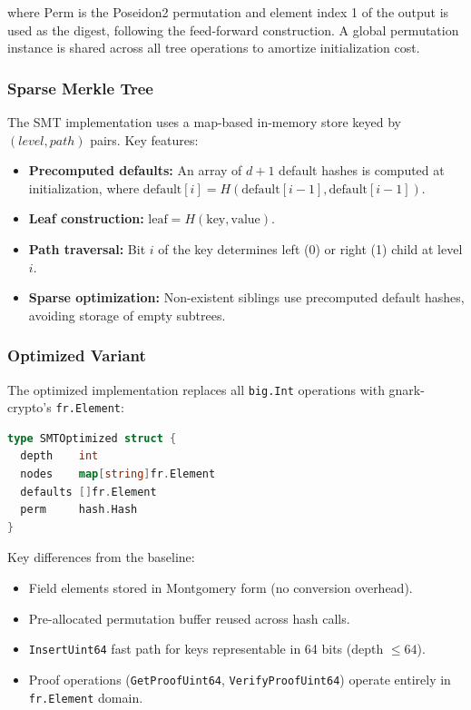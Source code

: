where $\text{Perm}$ is the Poseidon2 permutation and element
index 1 of the output is used as the digest, following the
feed-forward construction. A global permutation instance is
shared across all tree operations to amortize initialization cost.

\subsubsection{Sparse Merkle Tree}

The SMT implementation uses a map-based in-memory store keyed by
$(level, path)$ pairs. Key features:

\begin{itemize}
  \item \textbf{Precomputed defaults:} An array of $d + 1$ default
    hashes is computed at initialization, where
    $\text{default}[i] = H(\text{default}[i-1], \text{default}[i-1])$.
  \item \textbf{Leaf construction:}
    $\text{leaf} = H(\text{key}, \text{value})$.
  \item \textbf{Path traversal:} Bit $i$ of the key determines
    left (0) or right (1) child at level $i$.
  \item \textbf{Sparse optimization:} Non-existent siblings use
    precomputed default hashes, avoiding storage of empty subtrees.
\end{itemize}

\subsubsection{Optimized Variant}

The optimized implementation replaces all \texttt{big.Int} operations
with gnark-crypto's \texttt{fr.Element}:

\begin{lstlisting}[language=Go, caption=Optimized SMT node storage]
type SMTOptimized struct {
  depth    int
  nodes    map[string]fr.Element
  defaults []fr.Element
  perm     hash.Hash
}
\end{lstlisting}

Key differences from the baseline:
\begin{itemize}
  \item Field elements stored in Montgomery form (no conversion
    overhead).
  \item Pre-allocated permutation buffer reused across hash calls.
  \item \texttt{InsertUint64} fast path for keys representable in
    64 bits (depth $\leq 64$).
  \item Proof operations (\texttt{GetProofUint64},
    \texttt{VerifyProofUint64}) operate entirely in
    \texttt{fr.Element} domain.
\end{itemize}

